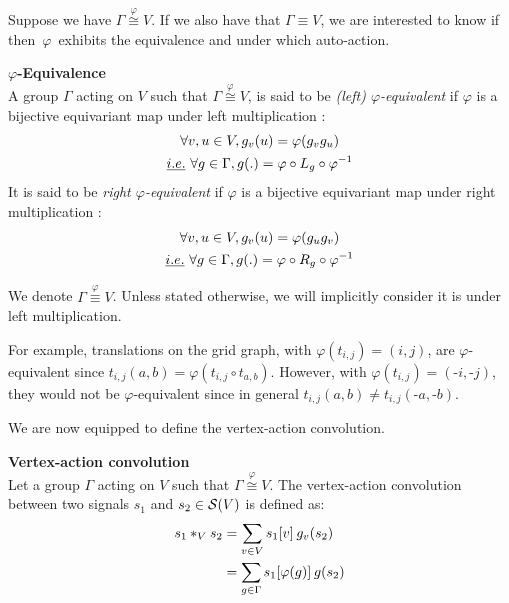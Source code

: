 Suppose we have $\Gamma \overset{\varphi}{\cong} V$. If we also have that $\Gamma \equiv V$, we are interested to know if then~$\varphi$~exhibits the equivalence and under which auto-action.

\begin{definition}\textbf{$\varphi$-Equivalence}\\
A group $\Gamma$ acting on $V$ such that $\Gamma \overset{\varphi}{\cong} V$, is said to be \emph{(left) $\varphi$-equivalent} if $\varphi$ is a bijective equivariant map under left multiplication \ie:
\begin{gather}
\forall v, u \in V, g_v(u) = \varphi(g_vg_u) \label{eq:P}\\
\ie \forall g \in \Gamma, g(.) = \varphi \circ L_g \circ \varphi^{-1} \label{eq:PP}
\end{gather}
It is said to be \emph{right $\varphi$-equivalent} if $\varphi$ is a bijective equivariant map under right multiplication \ie:
\begin{gather}
\forall v, u \in V, g_v(u) = \varphi(g_ug_v) \label{eq:PPP}\\
\ie \forall g \in \Gamma, g(.) = \varphi \circ R_g \circ \varphi^{-1} \label{eq:PPPP}
\end{gather}
\end{definition}

We denote $\Gamma \overset{\varphi}{\equiv} V$. Unless stated otherwise, we will implicitly consider it is under left multiplication.

\begin{remark}
For example, translations on the grid graph, with $\varphi(t_{i,j}) = (i,j)$, are $\varphi$-equivalent since $t_{i,j}(a,b) = \varphi(t_{i,j} \circ t_{a,b})$. However, with $\varphi(t_{i,j}) = (\text{-}i,\text{-}j)$, they would not be $\varphi$-equivalent since in general $t_{i,j}(a,b) \neq t_{i,j}(\text{-}a,\text{-}b)$.
\end{remark}

We are now equipped to define the vertex-action convolution.

\begin{definition}\textbf{Vertex-action convolution}\\
Let a group $\Gamma$ acting on $V$ such that $\Gamma \overset{\varphi}{\cong} V$.
The vertex-action convolution between two signals $s_1$ and $s_2 \in \cs(V)$ is defined as:
\begin{align}
s_1 \ast_V s_2 & = \displaystyle \sum_{v \in V} s_1[v] \h{2} g_v(s_2)\label{eq:vdom}\\
& = \displaystyle \sum_{g \in \Gamma} s_1[\varphi(g)] \h{2} g(s_2) \label{eq:premix}
\end{align}
\label{def:conv3}
\end{definition}

